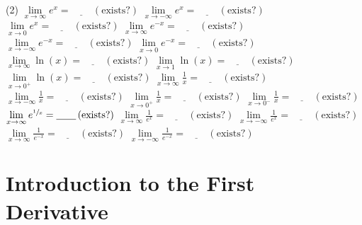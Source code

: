 \documentclass[12pt,]{book}
\theoremstyle{plain}
\theoremstyle{definition}
\numberwithin{equation}{section}
\newcommand{\fe}[2]{#1\mathopen{}\left(#2\right)\mathclose{}}
\begin{document}
\begin{exercisegroup}(2)
\exercise[24.]\hypertarget{exercise-160}{\null}\(\lim\limits_{x\to\infty}e^x=\underline{\qquad}\,(\text{exists?})\)%
\exercise[25.]\hypertarget{exercise-161}{\null}\(\lim\limits_{x\to-\infty}e^x=\underline{\qquad}\,(\text{exists?})\)%
\exercise[26.]\hypertarget{exercise-162}{\null}\(\lim\limits_{x\to0}e^x=\underline{\qquad}\,(\text{exists?})\)%
\exercise[27.]\hypertarget{exercise-163}{\null}\(\lim\limits_{x\to\infty}e^{-x}=\underline{\qquad}\,(\text{exists?})\)%
\exercise[28.]\hypertarget{exercise-164}{\null}\(\lim\limits_{x\to-\infty}e^{-x}=\underline{\qquad}\,(\text{exists?})\)%
\exercise[29.]\hypertarget{exercise-165}{\null}\(\lim\limits_{x\to0}e^{-x}=\underline{\qquad}\,(\text{exists?})\)%
\exercise[30.]\hypertarget{exercise-166}{\null}\(\lim\limits_{x\to\infty}\fe{\ln}{x}=\underline{\qquad}\,(\text{exists?})\)%
\exercise[31.]\hypertarget{exercise-167}{\null}\(\lim\limits_{x\to1}\fe{\ln}{x}=\underline{\qquad}\,(\text{exists?})\)%
\exercise[32.]\hypertarget{exercise-168}{\null}\(\lim\limits_{x\to0^{+}}\fe{\ln}{x}=\underline{\qquad}\,(\text{exists?})\)%
\exercise[33.]\hypertarget{exercise-169}{\null}\(\lim\limits_{x\to\infty}\frac{1}{x}=\underline{\qquad}\,(\text{exists?})\)%
\exercise[34.]\hypertarget{exercise-170}{\null}\(\lim\limits_{x\to-\infty}\frac{1}{x}=\underline{\qquad}\,(\text{exists?})\)%
\exercise[35.]\hypertarget{exercise-171}{\null}\(\lim\limits_{x\to0^{+}}\frac{1}{x}=\underline{\qquad}\,(\text{exists?})\)%
\exercise[36.]\hypertarget{exercise-172}{\null}\(\lim\limits_{x\to0^{-}}\frac{1}{x}=\underline{\qquad}\,(\text{exists?})\)%
\exercise[37.]\hypertarget{exercise-173}{\null}\(\lim\limits_{x\to\infty}e^{\sfrac{1}{x}}=\underline{\qquad}\,(\text{exists?})\)%
\exercise[38.]\hypertarget{exercise-174}{\null}\(\lim\limits_{x\to\infty}\frac{1}{e^x}=\underline{\qquad}\,(\text{exists?})\)%
\exercise[39.]\hypertarget{exercise-175}{\null}\(\lim\limits_{x\to-\infty}\frac{1}{e^x}=\underline{\qquad}\,(\text{exists?})\)%
\exercise[40.]\hypertarget{exercise-176}{\null}\(\lim\limits_{x\to\infty}\frac{1}{e^{-x}}=\underline{\qquad}\,(\text{exists?})\)%
\exercise[41.]\hypertarget{exercise-177}{\null}\(\lim\limits_{x\to-\infty}\frac{1}{e^{-x}}=\underline{\qquad}\,(\text{exists?})\)%
\end{exercisegroup}
\par\smallskip\noindent
\typeout{************************************************}
\typeout{************************************************}
\chapter[Introduction to the First Derivative]{Introduction to the First Derivative}\label{chapter-introduction-first-derivative}
\typeout{************************************************}
\typeout{************************************************}
\end{document}
